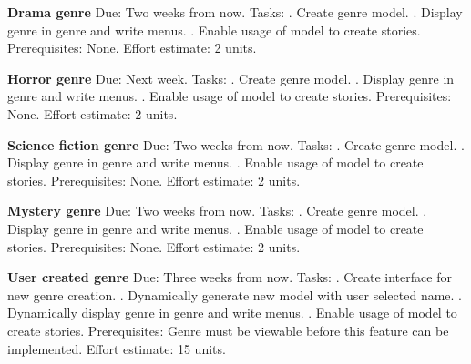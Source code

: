 \documentclass[12pt]{article}
\begin{document}
\textbf{Drama genre}\newline
Due: Two weeks from now.
\newline
Tasks: 
. Create genre model.
. Display genre in genre and write menus.
. Enable usage of model to create stories.
\newline
Prerequisites: None.
\newline
Effort estimate: 2 units. 

\textbf{Horror genre}\newline
Due: Next week.
\newline
Tasks: 
. Create genre model.
. Display genre in genre and write menus.
. Enable usage of model to create stories.
\newline
Prerequisites: None.
\newline
Effort estimate: 2 units. 

\textbf{Science fiction genre}\newline
Due: Two weeks from now.
\newline
Tasks: 
. Create genre model.
. Display genre in genre and write menus.
. Enable usage of model to create stories.
\newline
Prerequisites: None.
\newline
Effort estimate: 2 units. 

\textbf{Mystery genre}\newline
Due: Two weeks from now.
\newline
Tasks: 
. Create genre model.
. Display genre in genre and write menus.
. Enable usage of model to create stories.
\newline
Prerequisites: None.
\newline
Effort estimate: 2 units. 

\textbf{User created genre}\newline
Due: Three weeks from now.
\newline
Tasks: 
. Create interface for new genre creation.
. Dynamically generate new model with user selected name.
. Dynamically display genre in genre and write menus.
. Enable usage of model to create stories.
\newline
Prerequisites:
\newline
Genre must be viewable before this feature can be implemented.
\newline
Effort estimate: 15 units. 
\end{document}
